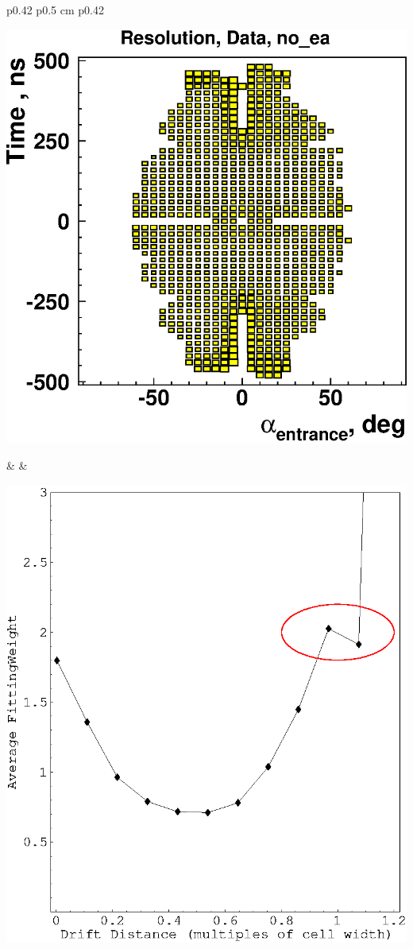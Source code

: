 \documentclass{article}
\begin{document}
\begin{center}
  \begin{tabular}{p{0.42\linewidth} p{0.5 cm} p{0.42\linewidth}}
    \begin{minipage}{\linewidth}
      \includegraphics*[height=\linewidth, angle=-90]{dubrovin_ea.eps}
    \end{minipage} & &
    \begin{minipage}{\linewidth}
      \includegraphics*[width=\linewidth]{plot_drift_14.eps}
    \end{minipage}
  \end{tabular}
\end{center}
\end{document}
